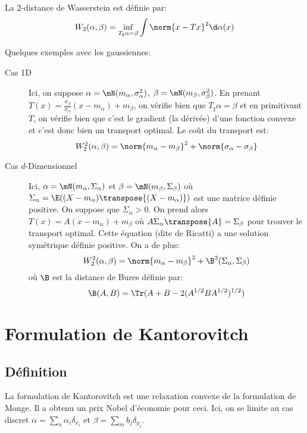 \documentclass[info, math, french]{mpb-cours}
\begin{document}
\begin{definition}
	La $2$-distance de Wasserstein est définie par:
	\begin{equation*}
		W_{2}(\alpha, \beta) = \inf_{T_{\sharp}\alpha = \beta} \int \norm{x - Tx}^{2}\d\alpha(x)
	\end{equation*}
\end{definition}

Quelques exemples avec les gaussiennes:
\begin{description}
	\item[Cas 1D] Ici, on suppose $\alpha = \mN(m_{\alpha}, \sigma_{\alpha}^{2})$, $\beta = \mN(m_{\beta}, \sigma_{\beta}^{2})$.
	      En prenant $T(x) = \frac{\sigma_{\beta}}{\sigma_{\alpha}}(x - m_{\alpha}) + m_{\beta}$, on vérifie bien que $T_{\sharp}\alpha = \beta$ et en primitivant $T$, on vérifie bien que c'est le gradient (la dérivée) d'une fonction convexe et c'est donc bien un transport optimal.
	      Le coût du transport est:
	      \begin{equation*}
		      W_{2}^{2}(\alpha, \beta) = \norm{m_{\alpha} - m_{\beta}}^{2} + \norm{\sigma_{\alpha} - \sigma_{\beta}}
	      \end{equation*}
	\item[Cas $d$-Dimensionnel] Ici, $\alpha = \mN(m_{\alpha}, \Sigma_{\alpha})$ et $\beta = \mN(m_{\beta}, \Sigma_{\beta})$ où $\Sigma_{\alpha} = \E((X- m_{\alpha})\transpose{(X-m_{\alpha})})$ est une matrice définie positive.
	      On suppose que $\Sigma_{\alpha} > 0$.
	      On prend alors $T(x) = A(x - m_{\alpha}) + m_{\beta}$ où $A\Sigma_{\alpha}\transpose{A} = \Sigma_{\beta}$ pour trouver le transport optimal.
	      Cette équation (dite de Ricatti) a une solution symétrique définie positive.
	      On a de plus:
	      \begin{equation*}
		      W_{2}^{2}(\alpha, \beta) = \norm{m_{\alpha} - m_{\beta}}^{2} + \B^{2}(\Sigma_{\alpha}, \Sigma_{\beta})
	      \end{equation*}
	      où $\B$ est la distance de Bures définie par:
	      \begin{equation*}
		      \B(A, B) = \Tr(A + B - 2(A^{1/2}BA^{1/2})^{1/2})
	      \end{equation*}
\end{description}

\section{Formulation de Kantorovitch}
\subsection{Définition}
La formulation de Kantorovitch est une relaxation convexe de la formulation de Monge.
Il a obtenu un prix Nobel d'économie pour ceci.
Ici, on se limite au cas discret $\alpha = \sum_{n} \alpha_{i}\delta_{x_{i}}$ et $\beta = \sum_{m} b_{j}\delta_{y_{j}}$.
\end{document}
